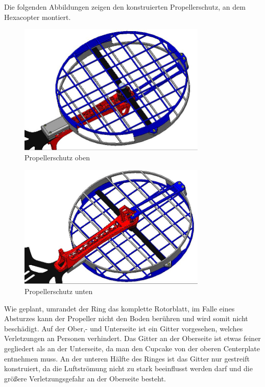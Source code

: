 	Die folgenden Abbildungen zeigen den konstruierten Propellerschutz, an dem Hexacopter montiert.

			\begin{figure}[tbh]
			\begin{centering}
			\includegraphics[width = 0.8\textwidth]{Bilder/propellerschutz_gesamt_oben}
			\par\end{centering}
			\caption{Propellerschutz oben}
			\label{propellerschutz_gesamt_oben}
			\end{figure}

			\begin{figure}[H]
			\begin{centering}
			\includegraphics[width = 0.8\textwidth]{Bilder/propellerschutz_gesamt_unten}
			\par\end{centering}
			\caption{Propellerschutz unten}
			\label{propellerschutz_gesamt_unten}
			\end{figure}

	Wie geplant, umrandet der Ring das komplette Rotorblatt, im Falle eines Absturzes kann der Propeller nicht den Boden berühren und wird somit nicht beschädigt.
	Auf der Ober,- und Unterseite ist ein Gitter vorgesehen, welches Verletzungen an Personen verhindert.
	Das Gitter an der Oberseite ist etwas feiner gegliedert als an der Unterseite, da man den Cupcake von der oberen Centerplate entnehmen muss.
	An der unteren Hälfte des Ringes ist das Gitter nur gestreift konstruiert, da die Luftströmung nicht zu stark beeinflusst werden darf und die größere Verletzungsgefahr an der Oberseite besteht.

